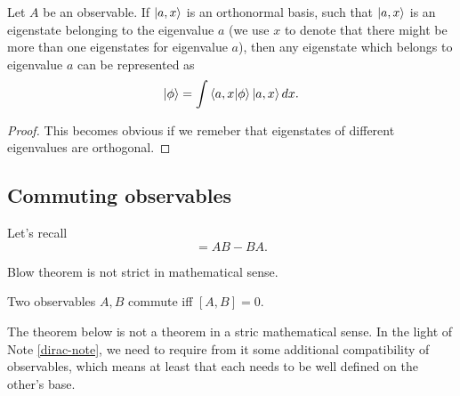 \documentclass[main.tex]{subfiles}
\begin{document}
\begin{proposition}
\label{eigenstate-representation}
Let $A$ be an observable. If $\ket{a, x}$ is an orthonormal basis, such that $\ket{a, x}$ is an eigenstate belonging to the eigenvalue $a$ (we use $x$ to denote that there might be more than one eigenstates for eigenvalue $a$), then any eigenstate which belongs to eigenvalue $a$ can be represented as
\begin{equation}
\ket{\phi} = \int \bra{a, x}\ket{\phi} \ket{a, x} d x.
\end{equation}
\end{proposition}
\begin{proof}
This becomes obvious if we remeber that eigenstates of different eigenvalues are orthogonal.
\end{proof}
\subsection{Commuting observables}

Let's recall
\begin{equation}
[A, B] = AB - BA.
\end{equation}

Blow theorem is not strict in mathematical sense.

\begin{definition}
Two observables $A, B$ commute iff $[A, B] = 0$.
\end{definition}

The theorem below is not a theorem in a stric mathematical sense. In the light of Note \ref{dirac-note}, we need to require from it some additional compatibility of observables, which means at least that each needs to be well defined on the other's base.
\end{document}
